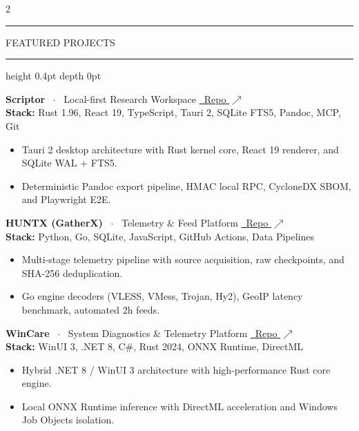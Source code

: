 \documentclass[10pt,a4paper]{article}
\newcommand{\resumesection}[1]{%
  \vspace{4.5pt}%
  \noindent%
  \begingroup%
  \color{ink}\bfseries\fontsize{9pt}{10.5pt}\selectfont%
  \textcolor{accent}{\rule[-0.5pt]{2.5pt}{9pt}}\hspace{4pt}%
  \MakeUppercase{#1}%
  \hspace{4pt}\leaders\hrule height 0.4pt depth 0pt\hfill\null%
  \endgroup%
  \vspace{2.5pt}%
}
\begin{document}
\begin{paracol}{2}
\resumesection{Featured Projects}

\noindent
\textbf{Scriptor} \ $\cdot$ \ {\scriptsize Local-first Research Workspace} \hfill \href{https://github.com/AmirrezaFarnamTaheri/Scriptor}{\scriptsize\color{accent}\faGithub\ Repo $\nearrow$}\\
{\scriptsize\color{muted}\textbf{Stack:} Rust 1.96, React 19, TypeScript, Tauri 2, SQLite FTS5, Pandoc, MCP, Git}
\begin{itemize}
  \item Tauri 2 desktop architecture with Rust kernel core, React 19 renderer, and SQLite WAL + FTS5.
  \item Deterministic Pandoc export pipeline, HMAC local RPC, CycloneDX SBOM, and Playwright E2E.
\end{itemize}

\vspace{2pt}
\noindent
\textbf{HUNTX (GatherX)} \ $\cdot$ \ {\scriptsize Telemetry \& Feed Platform} \hfill \href{https://github.com/AmirrezaFarnamTaheri/HUNTX}{\scriptsize\color{accent}\faGithub\ Repo $\nearrow$}\\
{\scriptsize\color{muted}\textbf{Stack:} Python, Go, SQLite, JavaScript, GitHub Actions, Data Pipelines}
\begin{itemize}
  \item Multi-stage telemetry pipeline with source acquisition, raw checkpoints, and SHA-256 deduplication.
  \item Go engine decoders (VLESS, VMess, Trojan, Hy2), GeoIP latency benchmark, automated 2h feeds.
\end{itemize}

\vspace{2pt}
\noindent
\textbf{WinCare} \ $\cdot$ \ {\scriptsize System Diagnostics \& Telemetry Platform} \hfill \href{https://github.com/AmirrezaFarnamTaheri/WinCare}{\scriptsize\color{accent}\faGithub\ Repo $\nearrow$}\\
{\scriptsize\color{muted}\textbf{Stack:} WinUI 3, .NET 8, C\#, Rust 2024, ONNX Runtime, DirectML}
\begin{itemize}
  \item Hybrid .NET 8 / WinUI 3 architecture with high-performance Rust core engine.
  \item Local ONNX Runtime inference with DirectML acceleration and Windows Job Objects isolation.
\end{itemize}

\switchcolumn


\end{paracol}
\end{document}
